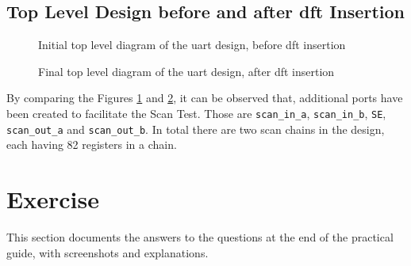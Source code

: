 \documentclass[a4paper,11pt]{article}%
\begin{document}
\pagebreak
\subsection{Top Level Design before and after \ac{dft} Insertion}

\begin{figure}[h]
	\centering
	\caption{Initial top level diagram of the \ac{uart} design,  before \ac{dft} insertion}
	\label{fig:init_top_level}
\end{figure}

\begin{figure}[h]
	\centering
	\caption{Final top level diagram of the \ac{uart} design, after \ac{dft} insertion}
	\label{fig:final_top_level}
\end{figure}

By comparing the Figures \ref{fig:init_top_level} and \ref{fig:final_top_level}, it can be observed that, additional ports have been created to facilitate the Scan Test. Those are {\tt scan\_in\_a}, {\tt scan\_in\_b}, {\tt SE}, {\tt scan\_out\_a} and {\tt scan\_out\_b}. In total there are two scan chains in the design, each having 82 registers in a chain.

\pagebreak
\section{Exercise}
This section documents the answers to the questions at the end of the practical guide, with screenshots and explanations.
\end{document}
